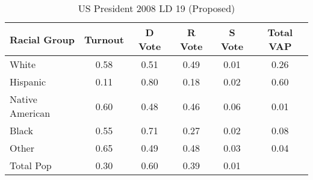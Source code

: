 \begin{table}[htb]
\begin{center}
\caption{US President 2008 LD 19 (Proposed)}
\label{pres08_vap_ld_19}
\begin{tabular}{lccccc}
  \hline
Racial Group & Turnout & D Vote & R Vote & S Vote & Total VAP \\ 
  \hline
White & 0.58 & 0.51 & 0.49 & 0.01 & 0.26 \\ 
  Hispanic & 0.11 & 0.80 & 0.18 & 0.02 & 0.60 \\ 
  Native American & 0.60 & 0.48 & 0.46 & 0.06 & 0.01 \\ 
  Black & 0.55 & 0.71 & 0.27 & 0.02 & 0.08 \\ 
  Other & 0.65 & 0.49 & 0.48 & 0.03 & 0.04 \\ 
  Total Pop & 0.30 & 0.60 & 0.39 & 0.01 &  \\ 
   \hline
\end{tabular}
\end{center}
\end{table}
